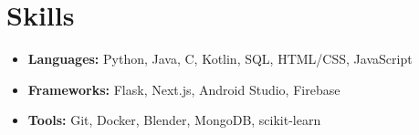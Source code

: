 \documentclass[a4paper,11pt]{article}
\newcommand{\resumeSubHeadingListStart}{\begin{itemize}[leftmargin=0.15in, label={}]}
\newcommand{\resumeSubHeadingListEnd}{\end{itemize}}
\begin{document}
\section{Skills}
  \resumeSubHeadingListStart
    \item{\textbf{Languages:} Python, Java, C, Kotlin, SQL, HTML/CSS, JavaScript} \\
    \item{\textbf{Frameworks:} Flask, Next.js, Android Studio, Firebase} \\
    \item{\textbf{Tools:} Git, Docker, Blender, MongoDB, scikit-learn}
  \resumeSubHeadingListEnd
\end{document}
